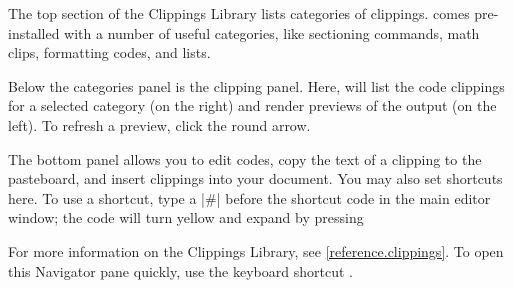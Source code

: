 The top section of the Clippings Library lists categories of clippings. \texnicle comes pre-installed with a number of useful categories, like sectioning commands, math clips, formatting codes, and lists.

Below the categories panel is the clipping panel. Here, \texnicle will list the code clippings for a selected category (on the right) and render previews of the output (on the left). To refresh a preview, click the round arrow.

The bottom panel allows you to edit codes, copy the text of a clipping to the pasteboard, and insert clippings into your document. You may also set shortcuts here. To use a shortcut, type a |#| before the shortcut code in the main editor window; the code will turn yellow and expand by pressing \keys{\returnkey}

For more information on the Clippings Library, see \ref{reference.clippings}. To open this Navigator pane quickly, use the keyboard shortcut .
\pagebreak\clearpage

